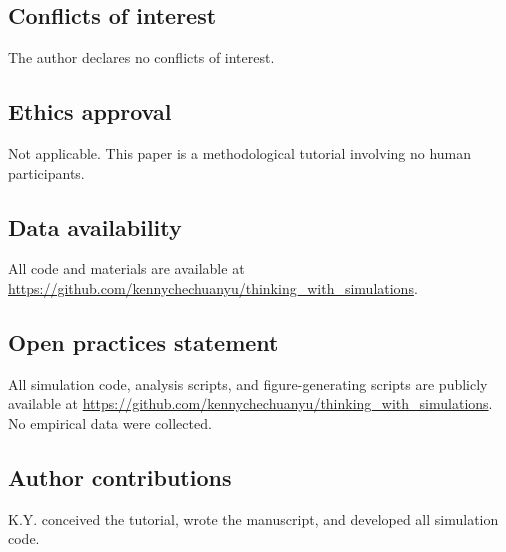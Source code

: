 \documentclass[fleqn,10pt]{wlscirep}
\begin{document}
\subsection*{Conflicts of interest}
The author declares no conflicts of interest.

\subsection*{Ethics approval}
Not applicable. This paper is a methodological tutorial involving no human participants.

\subsection*{Data availability}
All code and materials are available at \url{https://github.com/kennychechuanyu/thinking_with_simulations}.

\subsection*{Open practices statement}
All simulation code, analysis scripts, and figure-generating scripts are publicly available at \url{https://github.com/kennychechuanyu/thinking_with_simulations}. No empirical data were collected.

\subsection*{Author contributions}
K.Y. conceived the tutorial, wrote the manuscript, and developed all simulation code.



\end{document}
